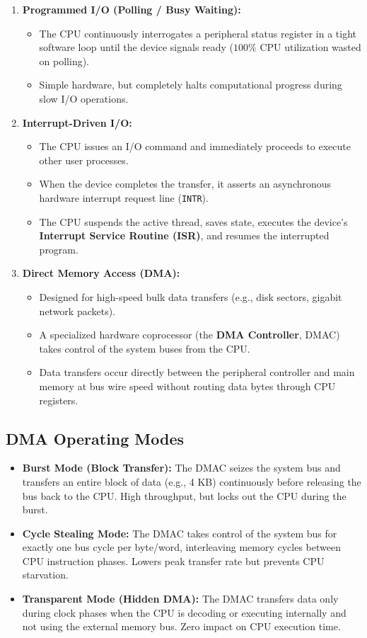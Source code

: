\begin{enumerate}[label=\bfseries\arabic*.]
    \item \textbf{Programmed I/O (Polling / Busy Waiting):}
    \begin{itemize}
        \item The CPU continuously interrogates a peripheral status register in a tight software loop until the device signals ready ($100\%$ CPU utilization wasted on polling).
        \item Simple hardware, but completely halts computational progress during slow I/O operations.
    \end{itemize}
    \item \textbf{Interrupt-Driven I/O:}
    \begin{itemize}
        \item The CPU issues an I/O command and immediately proceeds to execute other user processes.
        \item When the device completes the transfer, it asserts an asynchronous hardware interrupt request line (\texttt{INTR}).
        \item The CPU suspends the active thread, saves state, executes the device's \textbf{Interrupt Service Routine (ISR)}, and resumes the interrupted program.
    \end{itemize}
    \item \textbf{Direct Memory Access (DMA):}
    \begin{itemize}
        \item Designed for high-speed bulk data transfers (e.g., disk sectors, gigabit network packets).
        \item A specialized hardware coprocessor (the \textbf{DMA Controller}, DMAC) takes control of the system buses from the CPU.
        \item Data transfers occur directly between the peripheral controller and main memory at bus wire speed without routing data bytes through CPU registers.
    \end{itemize}
\end{enumerate}

\subsection{DMA Operating Modes}
\begin{itemize}
    \item \textbf{Burst Mode (Block Transfer):} The DMAC seizes the system bus and transfers an entire block of data (e.g., 4 KB) continuously before releasing the bus back to the CPU. High throughput, but locks out the CPU during the burst.
    \item \textbf{Cycle Stealing Mode:} The DMAC takes control of the system bus for exactly one bus cycle per byte/word, interleaving memory cycles between CPU instruction phases. Lowers peak transfer rate but prevents CPU starvation.
    \item \textbf{Transparent Mode (Hidden DMA):} The DMAC transfers data only during clock phases when the CPU is decoding or executing internally and not using the external memory bus. Zero impact on CPU execution time.
\end{itemize}

